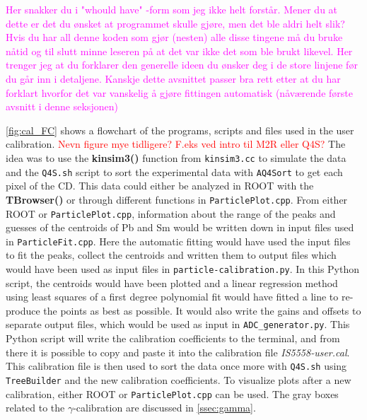 \documentclass[twoside,english]{uiofysmaster/uiofysmaster}
\newcommand{\ga}{$\gamma$}
\let\orgautoref\autoref
\renewcommand{\autoref}
        {%
		 \def\sectionautorefname{Section}%
		 \def\subsectionautorefname{Section}%
		 \def\subsubsectionautorefname{Section}%
		 \def\chapterautorefname{Chapter}%
          \orgautoref}
\begin{document}
\textcolor{magenta}{Her snakker du i "whould have" -form som jeg ikke helt forstår. Mener du at dette er det du ønsket at programmet skulle gjøre, men det ble aldri helt slik? Hvis du har all denne koden som gjør (nesten) alle disse tingene må du bruke nåtid og til slutt minne leseren på at det var ikke det som ble brukt likevel.  
Her trenger jeg at du forklarer den generelle ideen du ønsker deg i de store linjene før du går inn i detaljene. 
Kanskje dette avsnittet passer bra rett etter at du har forklart hvorfor det var vanskelig å gjøre fittingen automatisk (nåværende første avsnitt i denne seksjonen)}

\autoref{fig:cal_FC} shows a flowchart of the programs, scripts and files used in the user calibration. 
\textcolor{red}{Nevn figure mye tidligere? F.eks ved intro til M2R eller Q4S?}
The idea was to use the \textbf{kinsim3()} function from \texttt{kinsim3.cc} to simulate the data and the \texttt{Q4S.sh} script to sort the experimental data with \texttt{AQ4Sort} to get each pixel of the CD. 
This data could either be analyzed in ROOT with the \textbf{TBrowser()} or through different functions in \texttt{ParticlePlot.cpp}. 
From either ROOT or \texttt{ParticlePlot.cpp}, information about the range of the peaks and guesses of the centroids of Pb and Sm would be written down in input files used in \texttt{ParticleFit.cpp}. 
Here the automatic fitting would have used the input files to fit the peaks, collect the centroids and written them to output files which would have been used as input files in \texttt{particle-calibration.py}. 
In this Python script, the centroids would have been plotted and a linear regression method using least squares of a first degree polynomial fit \cite{Polyfit} would have fitted a line to re-produce the points as best as possible. 
It would also write the gains and offsets to separate output files, which would be used as input in \texttt{ADC\_generator.py}. 
This Python script will write the calibration coefficients to the terminal, and from there it is possible to copy and paste it into the calibration file \textit{IS5558-user.cal}. 
This calibration file is then used to sort the data once more with \texttt{Q4S.sh} using \texttt{TreeBuilder} and the new calibration coefficients.
To visualize plots after a new calibration, either ROOT or \texttt{ParticlePlot.cpp} can be used. 
The gray boxes related to the \ga-calibration are discussed in \autoref{ssec:gamma}.
\end{document}

